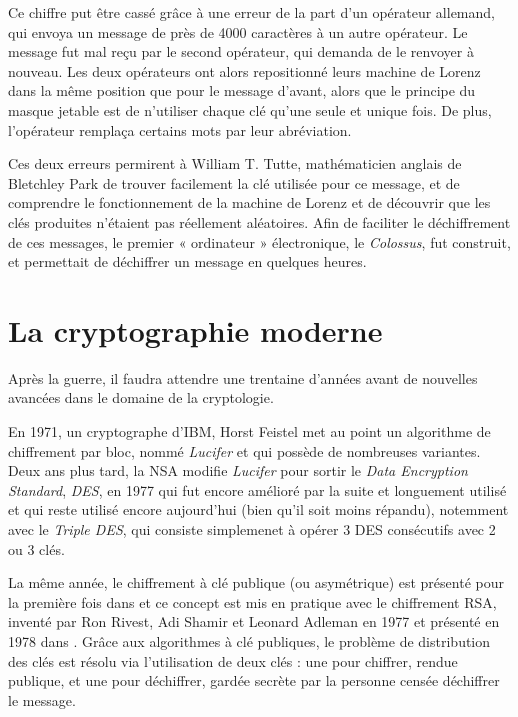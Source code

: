 Ce chiffre put être cassé grâce à une erreur de la part d'un opérateur
allemand, qui envoya un message de près de 4000 caractères à un autre
opérateur. Le message fut mal reçu par le second opérateur, qui
demanda de le renvoyer à nouveau. Les deux opérateurs ont alors
repositionné leurs machine de Lorenz dans la même position que pour
le message d'avant, alors que le principe du masque jetable est de
n'utiliser chaque clé qu'une seule et unique fois. De plus,
l'opérateur remplaça certains mots par leur abréviation. 

Ces deux erreurs permirent à William T. Tutte, mathématicien anglais
de Bletchley Park de trouver
facilement la clé utilisée pour ce message, et de comprendre le
fonctionnement de la machine de Lorenz et de découvrir que les clés
produites n'étaient pas réellement aléatoires. 
Afin de faciliter le déchiffrement de ces messages, le
premier « ordinateur » électronique, le \emph{Colossus}, fut
construit, et permettait de déchiffrer un message en quelques heures.


\section{La cryptographie moderne}
Après la guerre, il faudra attendre une trentaine d'années avant de
nouvelles avancées dans le domaine de la cryptologie. 

En 1971, un cryptographe d'IBM, Horst Feistel met au point un
algorithme de chiffrement par bloc, nommé \emph{Lucifer} et qui
possède de nombreuses variantes. Deux ans plus tard, la NSA modifie
\emph{Lucifer} pour sortir le \emph{Data Encryption Standard},
\emph{DES}, en 1977 qui fut encore amélioré par la suite et longuement
utilisé et qui reste utilisé encore aujourd'hui (bien qu'il soit moins
répandu), notemment avec le \emph{Triple DES}, qui consiste
simplemenet à opérer 3 DES consécutifs avec 2 ou 3 clés. %

La même année, le chiffrement à clé publique (ou asymétrique) est présenté
pour la première fois dans \cite{NewDirectionsInCryptography} et ce
concept est mis en pratique avec le chiffrement RSA, inventé par Ron
Rivest, Adi Shamir et Leonard Adleman en 1977 et présenté en 1978 dans
\cite{RSAPaper}. Grâce aux algorithmes à clé publiques, le problème de
distribution des clés est résolu via l'utilisation de deux clés : une
pour chiffrer, rendue publique, et une pour déchiffrer, gardée secrète
par la personne censée déchiffrer le message.

